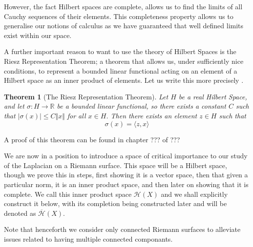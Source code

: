 \documentclass[11pt]{report}
\newtheorem{thm}{Theorem}[section]
\theoremstyle{definition}
\newtheorem{defn}[thm]{Definition}
\begin{document}
However, the fact Hilbert spaces are complete, allows us to find the limits of all Cauchy sequences of their elements. This completeness property allows us to generalise our notions of calculus as we have guaranteed that well defined limits exist within our space.

A further important reason to want to use the theory of Hilbert Spaces is the Riesz Representation Theorem; a theorem that allows us, under sufficiently nice conditions, to represent a bounded linear functional acting on an element of a Hilbert space as an inner product of elements. Let us write this more precisely .
\begin{thm}[The Riesz Representation Theorem]\label{RieszRepTheorem}
  Let $H$ be a real Hilbert Space, and let $\sigma \colon H \rightarrow \mathbb{R}$ be a bounded linear functional, so there exists a constant $C$ such that $|\sigma(x)| \leq C\Vert x\Vert $ for all $x \in H$. Then there exists an element $z \in H$ such that \[ \sigma(x) = \langle z, x \rangle \]
\end{thm}
A proof of this theorem can be found in chapter ??? of ???

We are now in a position to introduce a space of critical importance to our study of the Laplacian on a Riemann surface. This space will be a Hilbert space, though we prove this in steps, first showing it is a vector space, then that given a particular norm, it is an inner product space, and then later on showing that it is complete. We call this inner product space $\mathcal{H}(X)$ and we shall explicitly construct it below, with its completion being constructed later and will be denoted as $\overline{\mathcal{H}}(X)$. 

Note that henceforth we consider only connected Riemann surfaces to alleviate  issues related to having multiple connected componants.


\end{document}
